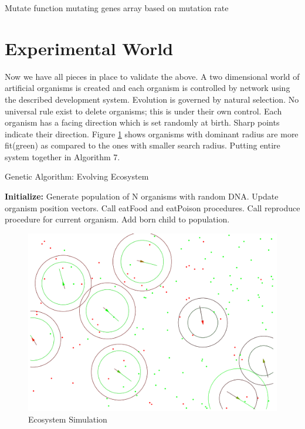 \documentclass[conference]{IEEEtran}
\begin{document}
\begin{algorithm}
\caption{Mutate function mutating genes array based on mutation rate}
\begin{algorithmic} 
\ELSE
{}
\ENDIF
\ENDIF
\ENDFOR
\end{algorithmic}
\end{algorithm}

\section{Experimental World}
Now we have all pieces in place to validate the above. A two dimensional world of artificial organisms is created and each organism is controlled by network using the described development system. Evolution is governed by natural selection. No universal rule exist to delete organisms; this is under their own control. Each organism has a facing direction which is set randomly at birth. Sharp points indicate their direction. Figure \ref{fig:ecosystem} shows organisms with dominant radius are more fit(green) as compared to the ones with smaller search radius. Putting entire system together in Algorithm 7.
\begin{algorithm}
\caption{Genetic Algorithm: Evolving Ecosystem}
\begin{algorithmic} 
\STATE \textbf{Initialize:} Generate population of N organisms with random DNA.
\LOOP
{}                    
\STATE Update organism position vectors.
\STATE Call eatFood and eatPoison procedures.
\STATE Call reproduce procedure for current organism.
\STATE Add born child to population.
\ENDIF
\ENDFOR
\ENDLOOP
\end{algorithmic}
\end{algorithm}
\begin{figure}
	\includegraphics[scale=0.329]{ecosystem.png}
	\caption{Ecosystem Simulation}
	\label{fig:ecosystem}
\end{figure}
\end{document}
